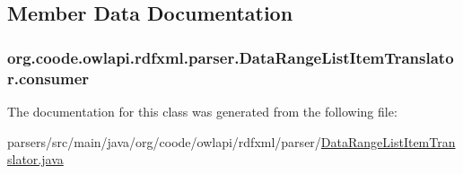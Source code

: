 \subsection{Member Data Documentation}
\hypertarget{classorg_1_1coode_1_1owlapi_1_1rdfxml_1_1parser_1_1_data_range_list_item_translator_af397e35a7adc51a35b854349a0a2d61a}{
\subsubsection[{consumer}]{ org.\-coode.\-owlapi.\-rdfxml.\-parser.\-Data\-Range\-List\-Item\-Translator.\-consumer\hspace{0.3cm}{\ttfamily [private]}}}\label{classorg_1_1coode_1_1owlapi_1_1rdfxml_1_1parser_1_1_data_range_list_item_translator_af397e35a7adc51a35b854349a0a2d61a}


The documentation for this class was generated from the following file\-:\begin{DoxyCompactItemize}
\item 
parsers/src/main/java/org/coode/owlapi/rdfxml/parser/\hyperlink{_data_range_list_item_translator_8java}{Data\-Range\-List\-Item\-Translator.\-java}\end{DoxyCompactItemize}

